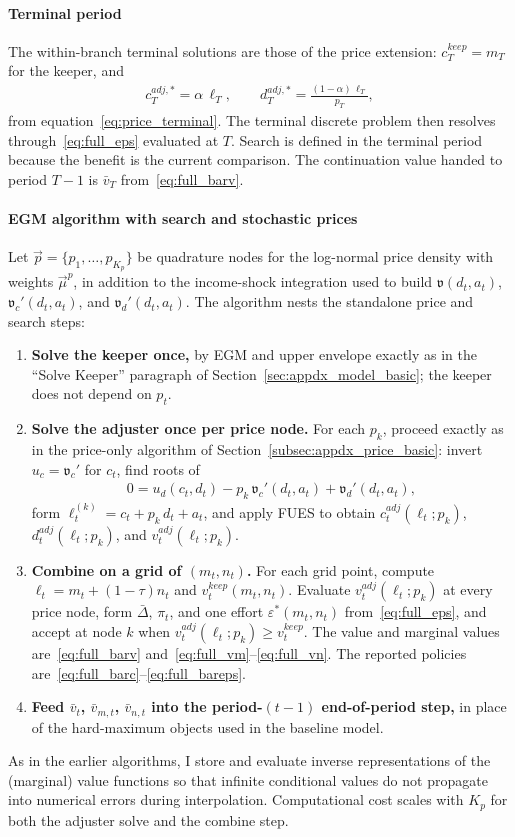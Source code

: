 \paragraph{Terminal period}
The within-branch terminal solutions are those of the price extension: $c_T^{keep}=m_T$ for the keeper, and
\begin{align}
	c_T^{adj,\ast}=\alpha\,\ell_T, \qquad d_T^{adj,\ast}=\frac{(1-\alpha)\,\ell_T}{p_T},
\end{align}
from equation~\eqref{eq:price_terminal}. The terminal discrete problem then resolves through~\eqref{eq:full_eps} evaluated at $T$. Search is defined in the terminal period because the benefit is the current comparison. The continuation value handed to period $T-1$ is $\bar v_T$ from~\eqref{eq:full_barv}.

\paragraph{EGM algorithm with search and stochastic prices}
Let $\vec p=\{p_1,\dots,p_{K_p}\}$ be quadrature nodes for the log-normal price density with weights $\vec\mu^p$, in addition to the income-shock integration used to build $\mathfrak{v}(d_t,a_t)$, $\mathfrak{v}_c'(d_t,a_t)$, and $\mathfrak{v}_d'(d_t,a_t)$. The algorithm nests the standalone price and search steps:
\begin{enumerate}
	\item \textbf{Solve the keeper once,} by EGM and upper envelope exactly as in the ``Solve Keeper'' paragraph of Section~\ref{sec:appdx_model_basic}; the keeper does not depend on $p_t$.
	\item \textbf{Solve the adjuster once per price node.} For each $p_k$, proceed exactly as in the price-only algorithm of Section~\ref{subsec:appdx_price_basic}: invert $u_c=\mathfrak{v}_c'$ for $c_t$, find roots of
	\begin{align}
		0 = u_d(c_t,d_t) - p_k\,\mathfrak{v}_c'(d_t,a_t) + \mathfrak{v}_d'(d_t,a_t),
	\end{align}
	form $\ell_t^{(k)}=c_t+p_k\,d_t+a_t$, and apply FUES to obtain $c_t^{adj}(\ell_t;p_k)$, $d_t^{adj}(\ell_t;p_k)$, and $v_t^{adj}(\ell_t;p_k)$.
	\item \textbf{Combine on a grid of $(m_t,n_t)$.} For each grid point, compute $\ell_t=m_t+(1-\tau)n_t$ and $v_t^{keep}(m_t,n_t)$. Evaluate $v_t^{adj}(\ell_t;p_k)$ at every price node, form $\bar\Delta$, $\pi_t$, and one effort $\varepsilon^\ast(m_t,n_t)$ from~\eqref{eq:full_eps}, and accept at node $k$ when $v_t^{adj}(\ell_t;p_k)\ge v_t^{keep}$. The value and marginal values are~\eqref{eq:full_barv} and~\eqref{eq:full_vm}--\eqref{eq:full_vn}. The reported policies are~\eqref{eq:full_barc}--\eqref{eq:full_bareps}.
	\item \textbf{Feed $\bar v_t$, $\bar v_{m,t}$, $\bar v_{n,t}$ into the period-$(t-1)$ end-of-period step,} in place of the hard-maximum objects used in the baseline model.
\end{enumerate}
As in the earlier algorithms, I store and evaluate inverse representations of the (marginal) value functions so that infinite conditional values do not propagate into numerical errors during interpolation. Computational cost scales with $K_p$ for both the adjuster solve and the combine step.
